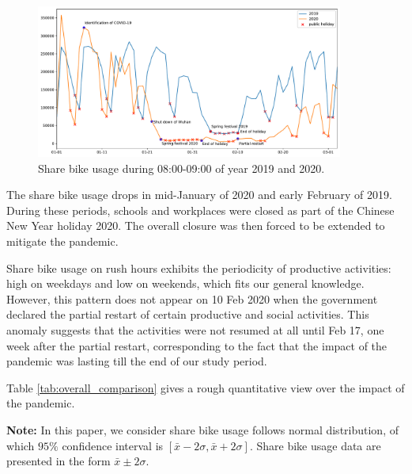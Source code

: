 \documentclass[ijgi,submit,moreauthors,pdftex]{Definitions/mdpi}
\begin{document}
\begin{figure}[ht]
    \centering
    \includegraphics[width=0.9\textwidth]{Figures/hour_8-eps-converted-to.pdf}
    \caption{Share bike usage during 08:00-09:00 of year 2019 and 2020.}
    \label{fig:hour_comparison_8}
\end{figure}

The share bike usage drops in mid-January of 2020 and early February of 2019.
During these periods, schools and workplaces were closed as part of the Chinese New Year holiday 2020.
The overall closure was then forced to be extended to mitigate the pandemic.

Share bike usage on rush hours exhibits the periodicity of productive activities: high on weekdays and low on weekends, which fits our general knowledge.
However, this pattern does not appear on 10 Feb 2020 when the government declared the partial restart of certain productive and social activities.
This anomaly suggests that the activities were not resumed at all until Feb 17, one week after the partial restart, corresponding to the fact that the impact of the pandemic was lasting till the end of our study period.

Table \ref{tab:overall_comparison} gives a rough quantitative view over the impact of the pandemic.

\textbf{Note:} In this paper, we consider share bike usage follows normal distribution, of which $95\%$ confidence interval is $[\bar{x}-2\sigma,\bar{x}+2\sigma]$.
Share bike usage data are presented in the form $\bar{x}\pm2\sigma$.
\end{document}
